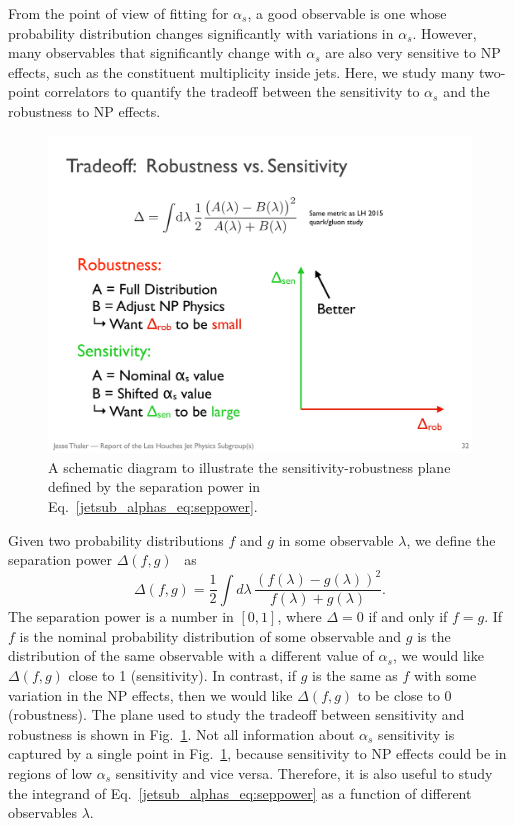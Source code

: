 \documentclass[11pt]{cernrep}
\begin{document}
From the point of view of fitting for $\alpha_s$, a good observable is one whose probability distribution changes significantly with variations in $\alpha_s$.
%
However, many observables that significantly change with $\alpha_s$ are also very sensitive to NP effects, such as the constituent multiplicity inside jets.
%
Here, we study many two-point correlators to quantify the tradeoff between the sensitivity to $\alpha_s$ and the robustness to NP effects.

\begin{figure}[t]
\begin{center}
\includegraphics[width = 0.4\columnwidth]{jetsub_alphas_robustnessschematic.pdf}
\end{center}
\caption{A schematic diagram to illustrate the sensitivity-robustness plane defined by the separation power in Eq.~\ref{jetsub_alphas_eq:seppower}.}
\label{jetsub_alphas_fig:robustnessschematic}
\end{figure}

Given two probability distributions $f$ and $g$ in some observable $\lambda$, we define the separation power $\Delta(f,g)$~\cite{Harrison:1998yr} as
%
\begin{equation}
\label{jetsub_alphas_eq:seppower}
\Delta(f,g)=\frac{1}{2}\int d\lambda \, \frac{(f(\lambda)-g(\lambda))^2}{f(\lambda)+g(\lambda)}.
\end{equation}
%
The separation power is a number in $[0,1]$, where $\Delta=0$ if and only if $f=g$.
%
If $f$ is the nominal probability distribution of some observable and $g$ is the distribution of the same observable with a different value of $\alpha_s$, we would like $\Delta(f,g)$ close to 1 (sensitivity).
%
In contrast, if $g$ is the same as $f$ with some variation in the NP effects, then we would like $\Delta(f,g)$ to be close to $0$ (robustness).
%
The plane used to study the tradeoff between sensitivity and robustness is shown in Fig.~\ref{jetsub_alphas_fig:robustnessschematic}.
%
Not all information about $\alpha_s$ sensitivity is captured by a single point in Fig.~\ref{jetsub_alphas_fig:robustnessschematic}, because sensitivity to NP effects could be in regions of low $\alpha_s$ sensitivity and vice versa.
%
Therefore, it is also useful to study the integrand of Eq.~\ref{jetsub_alphas_eq:seppower} as a function of different observables $\lambda$.
\end{document}
